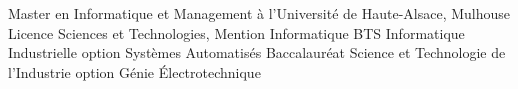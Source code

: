%
%
%


\begin{scholarship}
					{Master en Informatique et Management à l'Université de Haute-Alsace, Mulhouse}
					{Licence Sciences et Technologies, Mention Informatique}
					{BTS Informatique Industrielle option Systèmes Automatisés}
					{Baccalauréat Science et Technologie de l'Industrie option Génie Électrotechnique}
\end{scholarship}
